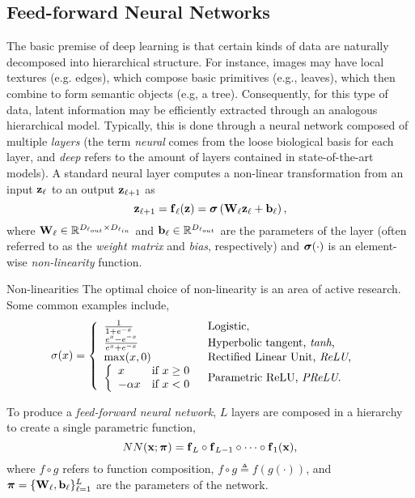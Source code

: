 \subsection{Feed-forward Neural Networks} 
The basic premise of deep learning is that certain kinds of data are naturally decomposed into hierarchical structure. For instance, images may have local textures (e.g. edges), which compose basic primitives (e.g., leaves), which then combine to form semantic objects (e.g, a tree). Consequently, for this type of data, latent information may be efficiently extracted through an analogous hierarchical model.  Typically, this is done through a neural network composed of multiple \textit{layers} (the term \textit{neural} comes from the loose biological basis for each layer, and \textit{deep} refers to the amount of layers contained in state-of-the-art models). A standard neural layer computes a non-linear transformation from an input $\boldsymbol{\mathbf{z}}_\ell$ to an output $\boldsymbol{\mathbf{z}}_{\ell+1}$ as  
\begin{equation}
\boldsymbol{\mathbf{z}}_{\ell+1} = \boldsymbol{\mathbf{f}}_\ell(\boldsymbol{\mathbf{z}}) = \boldsymbol{\mathbf{\sigma}}\left(\boldsymbol{\mathbf{W}}_\ell\boldsymbol{\mathbf{z}}_\ell + \boldsymbol{\mathbf{b}}_\ell\right),
\end{equation}
where $\boldsymbol{\mathbf{W}}_\ell \in \mathbb{R}^{D_{\ell_{out}} \times D_{\ell_{in}}}$ and $\boldsymbol{\mathbf{b}}_\ell \in \mathbb{R}^{D_{\ell_{out}}}$ are the parameters of the layer (often referred to as the \textit{weight matrix} and \textit{bias}, respectively) and $\boldsymbol{\mathbf{\sigma}}(\cdot)$ is an element-wise \textit{non-linearity} function.

\begin{remark}{Non-linearities}
	The optimal choice of non-linearity is an area of active research. Some common examples include, 
	\begin{align}
\sigma(x) &= \left\{  	\begin{array}{ll}
		 \frac{1}{1+e^{-x}}   & \mbox{Logistic,} \\
		 \frac{e^x - e^{-x}}{e^x + e^{-x}}  & \mbox{Hyperbolic tangent, \textit{tanh},} \\
		 \max(x, 0)  & \mbox{Rectified Linear Unit, \textit{ReLU},} \\
		\left\{  	\begin{array}{ll}  x & \mbox{if} ~x \geq 0 \\
										-\alpha x & \mbox{if} ~ x < 0 \end{array}
		\right.   & \mbox{Parametric ReLU, \textit{PReLU}.} \end{array}\right.
\end{align}
\end{remark}
To produce a \textit{feed-forward neural network}, $L$ layers are composed in a hierarchy to create a single parametric function,
\begin{equation}
 NN(\boldsymbol{\mathbf{x}}; \boldsymbol{\mathbf{\pi}}) = \boldsymbol{\mathbf{f}}_L \circ \boldsymbol{\mathbf{f}}_{L-1} \circ \cdots \circ \boldsymbol{\mathbf{f}}_{1}(\boldsymbol{\mathbf{x}}),
\end{equation}
where $f \circ g$ refers to function composition, $f \circ g \triangleq f (g(\cdot))$, and $\boldsymbol{\mathbf{\pi}} = \{\boldsymbol{\mathbf{W}}_\ell, \boldsymbol{\mathbf{b}}_\ell\}_{\ell=1}^L$ are the parameters of the network.


